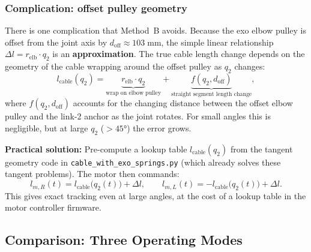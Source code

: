 \documentclass[11pt, a4paper]{article}
\begin{document}
\subsubsection{Complication: offset pulley geometry}

There is one complication that Method~B avoids.  Because the exo elbow
pulley is offset from the joint axis by $d_{\text{off}} \approx 103\;\text{mm}$,
the simple linear relationship $\Delta l = r_{\text{elb}} \cdot q_2$ is an
\textbf{approximation}.  The true cable length change depends on the
geometry of the cable wrapping around the offset pulley as $q_2$ changes:
%
\begin{equation}\label{eq:nonlinear}
    l_{\text{cable}}(q_2) = \underbrace{r_{\text{elb}} \cdot q_2}_{\text{wrap
    on elbow pulley}} + \underbrace{f(q_2, d_{\text{off}})}_{\text{straight
    segment length change}},
\end{equation}
%
where $f(q_2, d_{\text{off}})$ accounts for the changing distance between the
offset elbow pulley and the link-2 anchor as the joint rotates.  For small
angles this is negligible, but at large $q_2$ ($>45°$) the error grows.

\begin{mdframed}
\textbf{Practical solution:}
Pre-compute a lookup table $l_{\text{cable}}(q_2)$ from the tangent geometry
code in \texttt{cable\_with\_exo\_springs.py} (which already solves these
tangent problems).  The motor then commands:
\[
    l_{m,R}(t) = l_{\text{cable}}\bigl(q_2(t)\bigr) + \Delta l,
    \qquad
    l_{m,L}(t) = -l_{\text{cable}}\bigl(q_2(t)\bigr) + \Delta l.
\]
This gives exact tracking even at large angles, at the cost of a lookup
table in the motor controller firmware.
\end{mdframed}

\subsection{Comparison: Three Operating Modes}
\label{sec:three-modes}
\end{document}
